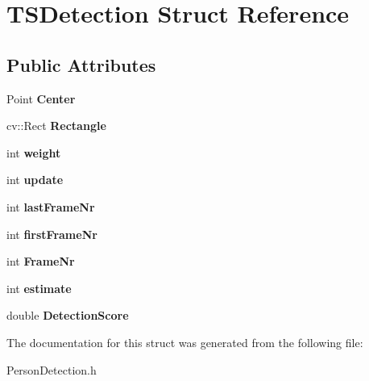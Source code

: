 \hypertarget{struct_t_s_detection}{\section{T\-S\-Detection Struct Reference}
\label{struct_t_s_detection}
}
\subsection*{Public Attributes}
\begin{DoxyCompactItemize}
\item 
\hypertarget{struct_t_s_detection_a073122df145365ca9162a817518b58e1}{Point {\bfseries Center}}\label{struct_t_s_detection_a073122df145365ca9162a817518b58e1}

\item 
\hypertarget{struct_t_s_detection_ae9ebe68d69098649d7010084524e8d00}{cv\-::\-Rect {\bfseries Rectangle}}\label{struct_t_s_detection_ae9ebe68d69098649d7010084524e8d00}

\item 
\hypertarget{struct_t_s_detection_aec6c04ef8c8bf464db2b6a04ada19646}{int {\bfseries weight}}\label{struct_t_s_detection_aec6c04ef8c8bf464db2b6a04ada19646}

\item 
\hypertarget{struct_t_s_detection_a100120abd1ce8f939de27406dbbeb334}{int {\bfseries update}}\label{struct_t_s_detection_a100120abd1ce8f939de27406dbbeb334}

\item 
\hypertarget{struct_t_s_detection_afc802f63d07908f4f9865f6c4d680b25}{int {\bfseries last\-Frame\-Nr}}\label{struct_t_s_detection_afc802f63d07908f4f9865f6c4d680b25}

\item 
\hypertarget{struct_t_s_detection_a57479a3d8734ed77c282bd0e5fae5a3e}{int {\bfseries first\-Frame\-Nr}}\label{struct_t_s_detection_a57479a3d8734ed77c282bd0e5fae5a3e}

\item 
\hypertarget{struct_t_s_detection_a843280e254b7d41f05829452f35fb8e3}{int {\bfseries Frame\-Nr}}\label{struct_t_s_detection_a843280e254b7d41f05829452f35fb8e3}

\item 
\hypertarget{struct_t_s_detection_ac0060de8674cb21f138b0b6c968f76e4}{int {\bfseries estimate}}\label{struct_t_s_detection_ac0060de8674cb21f138b0b6c968f76e4}

\item 
\hypertarget{struct_t_s_detection_adb44dab560d6a607fa363e8ade26eb26}{double {\bfseries Detection\-Score}}\label{struct_t_s_detection_adb44dab560d6a607fa363e8ade26eb26}

\end{DoxyCompactItemize}


The documentation for this struct was generated from the following file\-:\begin{DoxyCompactItemize}
\item 
Person\-Detection.\-h\end{DoxyCompactItemize}
